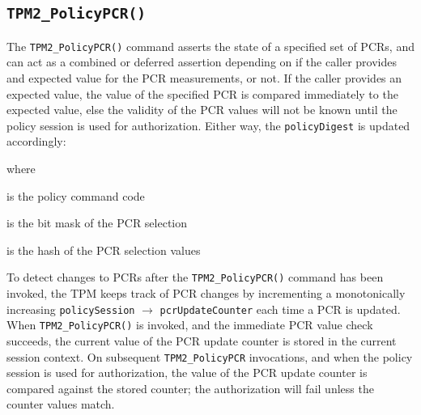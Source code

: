\documentclass{sig-alternate-2013}
\begin{document}
\vspace{.5\baselineskip}
\noindent
{}

\subsection{\texttt{TPM2\_PolicyPCR()}}

The \texttt{TPM2\_PolicyPCR()} command asserts the state of a specified set of
PCRs, and can act as a combined or deferred assertion depending on if the caller
provides and expected value for the PCR measurements, or not. If the caller
provides an expected value, the value of the specified PCR is compared
immediately to the expected value, else the validity of the PCR values will not
be known until the policy session is used for authorization. Either way, the
\texttt{policyDigest} is updated accordingly:

\vspace{.5\baselineskip}
\noindent
{}

\vspace{.5\baselineskip}
\noindent where

\begin{description}
  \small
  \item[$TPM\_CC\_PolicyPCR$] \hfill is the policy command code
  \item[$pcrs$] \hfill is the bit mask of the PCR selection
  \item[$digest$] \hfill is the hash of the PCR selection values 
\end{description}

To detect changes to PCRs after the \texttt{TPM2\_PolicyPCR()} command has been
invoked, the TPM keeps track of PCR changes by incrementing a monotonically
increasing \texttt{policySession} $\rightarrow$ \texttt{pcrUpdateCounter} each
time a PCR is updated. When \texttt{TPM2\_PolicyPCR()} is invoked, and the
immediate PCR value check succeeds, the current value of the PCR update counter
is stored in the current session context. On subsequent \texttt{TPM2\_PolicyPCR}
invocations, and when the policy session is used for authorization, the value of
the PCR update counter is compared against the stored counter; the authorization
will fail unless the counter values match.



 \fi
\end{document}
